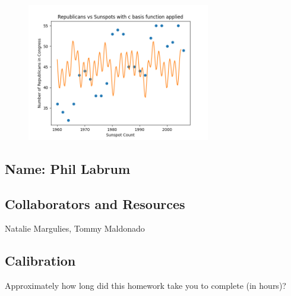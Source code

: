 \documentclass[submit]{harvardml}
\begin{document}
\begin{enumerate}
\begin{enumerate}
\begin{figure}[H]
            \includegraphics[width=8cm]{hw1/T1P4_plots/plot6.png}
            \centering
        \end{figure}
    \end{enumerate}
    
\end{enumerate}

\newpage
\subsection*{Name: Phil Labrum}

\subsection*{Collaborators and Resources}
Natalie Margulies, Tommy Maldonado

\subsection*{Calibration}
Approximately how long did this homework take you to complete (in hours)? 
\end{document}
